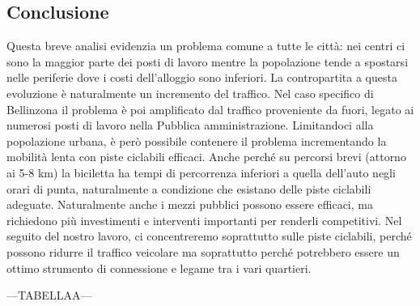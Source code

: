\subsection{Conclusione}
Questa breve analisi evidenzia un problema comune a tutte le città: nei centri ci sono la maggior parte dei posti di lavoro mentre la popolazione tende a spostarsi nelle periferie dove i costi dell’alloggio sono inferiori. La contropartita a questa evoluzione è naturalmente un incremento del traffico. Nel caso specifico di Bellinzona il problema è poi amplificato dal traffico proveniente da fuori, legato ai numerosi posti di lavoro nella Pubblica amministrazione. Limitandoci alla popolazione urbana, è però possibile contenere il problema incrementando la mobilità lenta con piste ciclabili efficaci.
Anche perché su percorsi brevi (attorno ai 5-8 km) la biciletta ha tempi di percorrenza inferiori a quella dell’auto negli orari di punta, naturalmente a condizione che esistano delle piste ciclabili adeguate. Naturalmente anche i mezzi pubblici possono essere efficaci, ma richiedono più investimenti e interventi importanti per renderli competitivi.
Nel seguito del nostro lavoro, ci concentreremo soprattutto sulle piste ciclabili, perché possono ridurre il traffico veicolare ma soprattutto perché potrebbero essere un ottimo strumento di connessione e legame tra i vari quartieri.

---TABELLAA---

